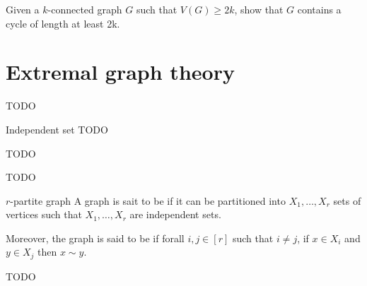 \documentclass[a4paper, 12pt]{report}
\begin{document}
    \begin{framedprob}{}
        Given a $k$-connected graph $G$ such that $V(G) \ge 2k$, show that $G$ contains a cycle of length at least 2k.
    \end{framedprob}


    \chapter{Extremal graph theory}

    TODO 

    \begin{frameddefn}{Independent set}
        TODO
    \end{frameddefn}

    TODO 

    TODO 

    \begin{frameddefn}{$r$-partite graph}
        A graph is sait to be  if it can be partitioned into $X_1, \ldots, X_r$ sets of vertices such that $X_1, \ldots, X_r$ are independent sets.

        Moreover, the graph is said to be  if forall $i, j \in [r]$ such that $i \neq j$, if $x \in X_i$ and $y \in X_j$ then $x \sim y$.
    \end{frameddefn}

    TODO 

\end{document}
